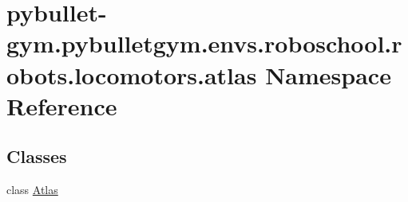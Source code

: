 \hypertarget{namespacepybullet-gym_1_1pybulletgym_1_1envs_1_1roboschool_1_1robots_1_1locomotors_1_1atlas}{}\section{pybullet-\/gym.pybulletgym.\+envs.\+roboschool.\+robots.\+locomotors.\+atlas Namespace Reference}
\label{namespacepybullet-gym_1_1pybulletgym_1_1envs_1_1roboschool_1_1robots_1_1locomotors_1_1atlas}
\subsection*{Classes}
\begin{DoxyCompactItemize}
\item 
class \hyperlink{classpybullet-gym_1_1pybulletgym_1_1envs_1_1roboschool_1_1robots_1_1locomotors_1_1atlas_1_1_atlas}{Atlas}
\end{DoxyCompactItemize}
